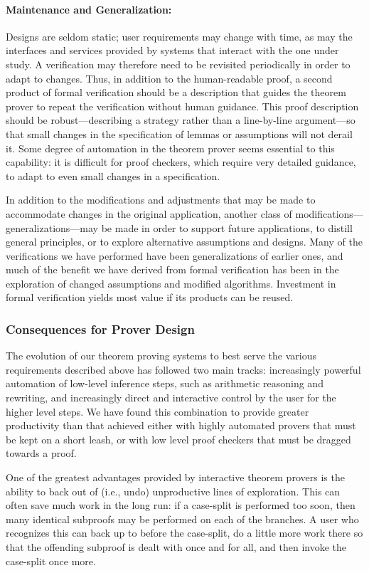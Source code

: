 \paragraph{Maintenance and Generalization:}
Designs are seldom static; user requirements may change with time, as
may the interfaces and services provided by systems that interact with
the one under study.  A verification may therefore need to be
revisited periodically in order to adapt to changes.  Thus, in addition to
the human-readable proof, a second product of formal verification
should be a description that guides the theorem prover to repeat the
verification without human guidance.  This proof description should be
robust---describing a strategy rather than a line-by-line
argument---so that small changes in the specification of lemmas or
assumptions will not derail it.  Some degree of automation in the
theorem prover seems essential to this capability: it is difficult for
proof checkers, which require very detailed guidance, to adapt to even
small changes in a specification.

In addition to the modifications and adjustments that may be made to
accommodate changes in the original application, another class of
modifications---generalizations---may be made in order to support
future applications, to distill general principles, or to explore
alternative assumptions and designs.  Many of the verifications we
have performed have been generalizations of earlier ones, and much of
the benefit we have derived from formal verification has been in the
exploration of changed assumptions and modified algorithms.
Investment in formal verification yields most value if its
products can be reused.

\subsubsection*{Consequences for Prover Design}
The evolution of our theorem proving systems to best serve the
various requirements described above has followed two main tracks:
increasingly powerful automation of low-level inference steps, such
as arithmetic reasoning and rewriting, and increasingly direct and
interactive control by the user for the higher level steps.  We have
found this combination to provide greater productivity than that
achieved either with highly automated provers that must be kept on a
short leash, or with low level proof checkers that must be dragged
towards a proof.

One of the greatest advantages provided by interactive theorem provers
is the ability to back out of (i.e., undo) unproductive lines of
exploration.   This can often save much work in the long run: if a
case-split is performed too soon, then many identical subproofs may be
performed on each of the branches.   A user who recognizes this can
back up to before the case-split, do a little more work there so that
the offending subproof is dealt with once and for all, and then invoke
the case-split once more.

